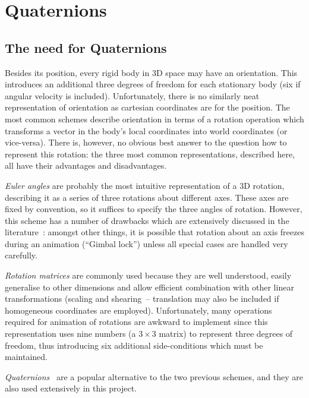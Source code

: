 \section{Quaternions}
\subsection{The need for Quaternions}
Besides its position, every rigid body in 3D space may have an orientation. This introduces an
additional three degrees of freedom for each stationary body (six if
angular velocity is included). Unfortunately, there is no similarly neat representation of
orientation as cartesian coordinates are for the position. The most common schemes describe
orientation in terms of a rotation operation which transforms a vector in the body's local
coordinates into world coordinates (or vice-versa). There is, however, no obvious best
answer to the question how to represent this rotation: the three most common representations,
described here, all have their advantages and disadvantages.

{\em Euler angles} are probably the most intuitive representation of a 3D rotation, describing
it as a series of three rotations about different axes. These axes are fixed by convention, so it
suffices to specify the three angles of rotation. However, this scheme has a number of drawbacks
which are extensively discussed in the literature~\cite{Saunders:PhD,Shoemake:85}: amongst other
things, it is possible that rotation about an axis freezes during an animation (``Gimbal lock'')
unless all special cases are handled very carefully.

{\em Rotation matrices} are commonly used because they are well understood, easily generalise
to other dimensions and allow efficient combination with other linear transformations (scaling
and shearing~-- translation may also be included if homogeneous coordinates are employed).
Unfortunately, many operations required for animation of rotations are awkward to implement
since this representation uses nine numbers (a $3\times3$ matrix) to represent three degrees
of freedom, thus introducing six additional side-conditions which must be maintained.

{\em Quaternions}~\cite{Shoemake:85,Eberly:01} are a popular alternative to the two
previous schemes, and they are also used extensively in this project.

